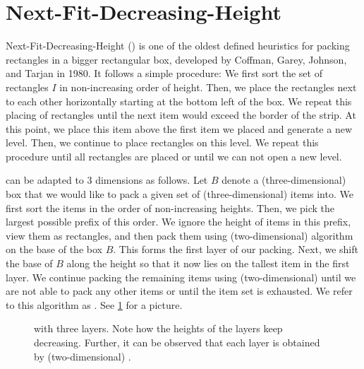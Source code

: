 \section{Next-Fit-Decreasing-Height}
\label{subsec:nfdh}
Next-Fit-Decreasing-Height (\NFDH) is one of the oldest defined heuristics for packing rectangles in a bigger rectangular box, 
developed by Coffman, Garey, Johnson, and Tarjan \cite{coffman1980performance} in 1980.
It follows a simple procedure: We first sort the set of rectangles $I$ in non-increasing order of height. Then, we place the rectangles next to each other horizontally starting at the bottom left of the box.  We repeat this placing of rectangles until the next item would exceed the border of the strip. At this point, we place this item above the first item we placed and generate a new level. Then, we continue to place rectangles on this level. We repeat this procedure until all rectangles are placed or until we can not open a new level.

\NFDH can be adapted to $3$ dimensions as follows. Let $B$ denote a (three-dimensional) box that we would like to pack a given set of (three-dimensional) items into.
We first sort the items in the order of non-increasing heights.
Then, we pick the largest possible prefix of this order. We ignore the height of items in this prefix,
view them as rectangles,
and then pack them using (two-dimensional) \NFDH algorithm on the base of the box $B$.
This forms the first layer of our packing. Next, we shift the base of
$B$ along the height so that it now lies on the tallest item in the first layer. We continue packing the remaining items using (two-dimensional) \NFDH until we are not able to pack any other items or 
until the item set is exhausted. We refer to this algorithm as \tNFDH. See \cref{fig:3d-nfdh} for a picture.

\begin{figure}
    \centering
    
    \caption{\tNFDH with three layers. Note how the heights of the layers keep decreasing. Further, it can be observed that each layer is obtained by (two-dimensional) \NFDH.}
    \label{fig:3d-nfdh}
\end{figure}

